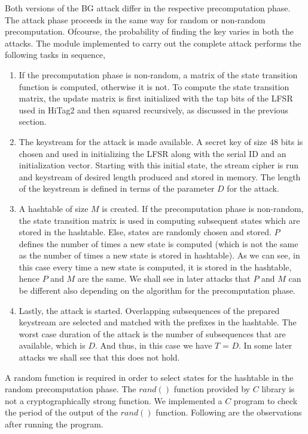 Both versions of the BG attack differ in the respective precomputation phase. The attack phase proceeds in the same way for random or non-random precomputation. Ofcourse, the probability of finding the key varies in both the attacks. The module implemented to carry out the complete attack performs the following tasks in sequence,
\begin{enumerate}
\item If the precomputation phase is non-random, a matrix of the state transition function is computed, otherwise it is not. To compute the state transition matrix, the update matrix is first initialized with the tap bits of the LFSR used in HiTag2 and then squared recursively, as discussed in the previous section.
\item The keystream for the attack is made available. A secret key of size $48$ bits is chosen and used in initializing the LFSR along with the serial ID and an initialization vector. Starting with this initial state, the stream cipher is run and keystream of desired length produced and stored in memory. The length of the keystream is defined in terms of the parameter $D$ for the attack.
\item A hashtable of size $M$ is created. If the precomputation phase is non-random, the state transition matrix is used in computing subsequent states which are stored in the hashtable. Else, states are randomly chosen and stored. $P$ defines the number of times a new state is computed (which is not the same as the number of times a new state is stored in hashtable). As we can see, in this case every time a new state is computed, it is stored in the hashtable, hence $P$ and $M$ are the same. We shall see in later attacks that $P$ and $M$ can be different also depending on the algorithm for the precomputation phase. 
\item Lastly, the attack is started. Overlapping subsequences of the prepared keystream are selected and matched with the prefixes in the hashtable. The worst case duration of the attack is the number of subsequences that are available, which is $D$. And thus, in this case we have $T$ = $D$. In some later attacks we shall see that this does not hold. 
\end{enumerate}


A random function is required in order to select states for the hashtable in the random precomputation phase. The $rand()$ function provided by $C$ library is not a cryptographically strong function. We implemented a $C$ program to check the period of the output of the $rand()$ function. Following are the observations after running the program.

